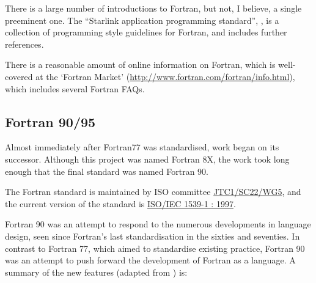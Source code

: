 \documentclass[11pt,oneside,chapters]{starlink}
\begin{document}
There is a large number of introductions to Fortran, but not, I
believe, a single preeminent one.  The
``Starlink application programming standard'',
,
is a collection of programming style guidelines for Fortran,
and includes further references.

There is a reasonable amount of online information on
Fortran, which is well-covered at the `Fortran Market'
(\url{http://www.fortran.com/fortran/info.html}),
which includes several Fortran FAQs.


\subsection{Fortran 90/95}
\label{s:fortran90}

Almost immediately after Fortran77 was standardised, work began on
its successor.  Although this project was named Fortran 8X, the work
took long enough that the final standard was named Fortran 90.

The Fortran standard is maintained by ISO committee
\href{http://www.nag.co.uk/sc22wg5/}{JTC1/SC22/WG5},
and the current version of the standard is
\href{http://www.nag.co.uk/sc22wg5/IS1539-1\_1997.html}{ISO/IEC 1539-1 : 1997}.

Fortran 90 was an attempt to respond to the numerous developments in
language design, seen since Fortran's last standardisation in the
sixties and seventies.  In contrast to Fortran 77, which aimed to
standardise existing practice, Fortran 90 was an attempt to push
forward the development of Fortran as a language.  A summary of the
new features (adapted from \citet{metcalf96}) is:
\end{document}
